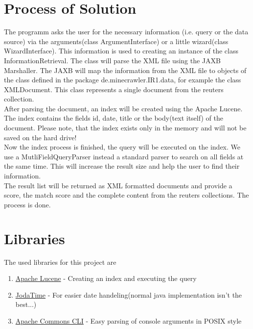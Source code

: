 \documentclass{scrartcl}
\begin{document}
\section{Process of Solution}
The programm asks the user for the necessary information (i.e. query or the data source) via the arguments(class ArgumentInterface) or a little wizard(class WizardInterface). This information is used to creating an instance of the class InformationRetrieval. The class will parse the XML file using the JAXB Marshaller. The JAXB will map the information from the XML file to objects of the class defined in the package de.minecrawler.IR1.data, for example the class XMLDocument. This class represents a single document from the reuters collection. \\
After parsing the document, an index will be created using the Apache Lucene. The index contains the fields id, date, title or the body(text itself) of the document. Please note, that the index exists only in the memory and will not be saved on the hard drive! \\
Now the index process is finished, the query will be executed on the index. We use a MutliFieldQueryParser instead a standard parser to search on all fields at the same time. This will increase the result size and help the user to find their information.\\
The result list will be returned as XML formatted documents and provide a score, the match score and the complete content from the reuters collections. The process is done.
\section{Libraries}
The used libraries for this project are

\begin{enumerate}
	\item \href{http://lucene.apache.org/}{Apache Lucene} - Creating an index and executing the query
	\item \href{http://www.joda.org/joda-time/}{JodaTime} - For easier date handeling(normal java implementation isn't the best...)
	\item \href{http://commons.apache.org/proper/commons-cli/}{Apache Commons CLI} - Easy parsing of console arguments in POSIX style
\end{enumerate}
\end{document}
